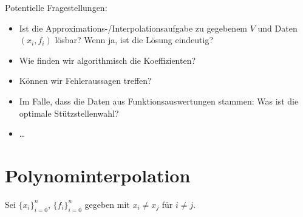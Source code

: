 \documentclass[
]{mycourse}
\begin{document}
Potentielle Fragestellungen:
\begin{itemize}
	\item 
		Ist die Approximations-/Interpolationsaufgabe zu gegebenem $V$ und Daten $(x_i,f_i)$ lösbar?
		Wenn ja, ist die Lösung eindeutig?
	\item
		Wie finden wir algorithmisch die Koeffizienten?
	\item
		Können wir Fehleraussagen treffen?
	\item
		Im Falle, dass die Daten aus Funktionsauswertungen stammen:
		Was ist die optimale Stützstellenwahl?
	\item
		\dots
\end{itemize}


\section{Polynominterpolation}

Sei $\{x_i\}_{i=0}^n$, $\{f_i\}_{i=0}^n$ gegeben mit $x_i\neq x_j$ für $i\neq j$.
\end{document}
